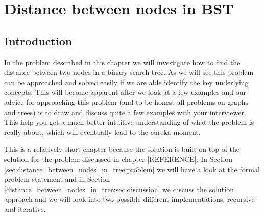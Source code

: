 %

\chapter{Distance between nodes in BST}
\label{ch:distance_between_nodes_in_tree}
\section*{Introduction}

In the problem described in this chapter  we will investigate how to find the
distance between two nodes in a binary search tree. As we will see this problem can be approached
and solved easily if we are able identify the key underlying concepts. This will 
become apparent after we look at a few examples and our advice for approaching this problem (and to
be honest all problems on graphs and trees) is to draw and discuss quite a few examples with your
interviewer. This help you get a much better intuitive understanding of what the problem is really
about, which will eventually lead to the eureka moment.

This is a relatively short chapter because the solution is built on top of the solution
for the  problem discussed in chapter [REFERENCE]. In Section
\ref{sec:distance_between_nodes_in_tree:problem} we will have a look at the formal problem statement
and in Section \ref{distance_between_nodes_in_tree:sec:discussion} we discuss the solution approach
and we will look into two possible different implementations: recursive and iterative. 

